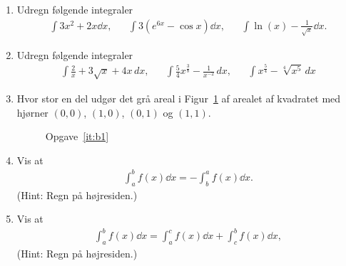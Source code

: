 \begin{enumerate}
	\item Udregn følgende integraler
	\begin{align*}
	\int 3x^2+2x\dd x,&& \int 3(e^{6x}-\cos x) \dd x,&& \int \ln(x)-\frac{1}{\sqrt{x}} \dd x.
	\end{align*}
	

	
	\item Udregn følgende integraler
	\begin{align*}
	\int \frac{2}{x}+3\sqrt{x}+4x \, d x,&& \int \frac{5}{4} x^{\frac{3}{8}}-\frac{1}{x^{-2}} \, d x,&& \int x^{\frac{5}{4}}-\sqrt[4]{x^5}\, d x
	\end{align*}
	
	
	\item \label{it:b1} Hvor stor en del udgør det grå areal i Figur~\ref{fig:b1} af arealet af kvadratet med hjørner $(0,0)$, $(1,0)$, $(0,1)$ og $(1,1)$.
	\begin{figure}
		\centering
		\caption{Opgave~\ref{it:b1}}
		\label{fig:b1}
	\end{figure}
	
	\item \label{it:bes3} Vis at 
	\begin{align*}
	\int_{a}^{b} f(x)\dd x=-\int_{b}^{a} f(x) \dd x.
	\end{align*}
	(Hint: Regn på højresiden.)
	
	\item \label{it:best2} Vis at 
	\begin{align*}
	\int_a^b f(x)\dd x=\int_a^c f(x)\dd x+\int_c^b f(x)\dd x,
	\end{align*}
	(Hint: Regn på højresiden.)
	
	
\end{enumerate}